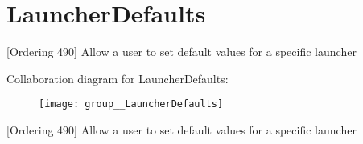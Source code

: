 \hypertarget{group__LauncherDefaults}{\section{Launcher\-Defaults}
\label{group__LauncherDefaults}
}


\mbox{[}Ordering 490\mbox{]} Allow a user to set default values for a specific launcher  


Collaboration diagram for Launcher\-Defaults\-:\nopagebreak
\begin{figure}[H]
\begin{center}
\leavevmode
\texttt{[image: group\_\_LauncherDefaults]}
\end{center}
\end{figure}
\mbox{[}Ordering 490\mbox{]} Allow a user to set default values for a specific launcher 